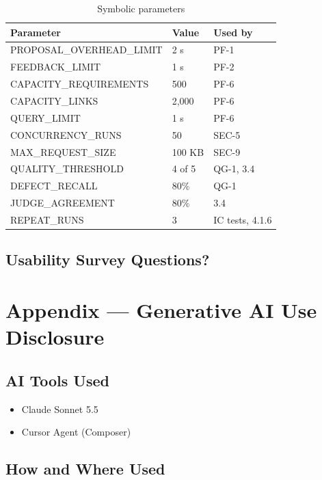 \documentclass[12pt, titlepage]{article}
\begin{document}
\begin{table}[H]
\centering
\caption{Symbolic parameters}
\label{tab:symbolic-parameters}
\begin{tabular}{lll}
\toprule
\textbf{Parameter} & \textbf{Value} & \textbf{Used by} \\
\midrule
PROPOSAL\_OVERHEAD\_LIMIT & 2 s & PF-1 \\
FEEDBACK\_LIMIT & 1 s & PF-2 \\
CAPACITY\_REQUIREMENTS & 500 & PF-6 \\
CAPACITY\_LINKS & 2,000 & PF-6 \\
QUERY\_LIMIT & 1 s & PF-6 \\
CONCURRENCY\_RUNS & 50 & SEC-5 \\
MAX\_REQUEST\_SIZE & 100 KB & SEC-9 \\
QUALITY\_THRESHOLD & 4 of 5 & QG-1, 3.4 \\
DEFECT\_RECALL & 80\% & QG-1 \\
JUDGE\_AGREEMENT & 80\% & 3.4 \\
REPEAT\_RUNS & 3 & IC tests, 4.1.6 \\
\bottomrule
\end{tabular}
\end{table}

\subsection{Usability Survey Questions?}


\newpage{}

\section{Appendix --- Generative AI Use Disclosure}

\subsection{AI Tools Used}

\begin{itemize}
  \item Claude Sonnet 5.5
  \item Cursor Agent (Composer)
\end{itemize}

\subsection{How and Where Used}
\end{document}

